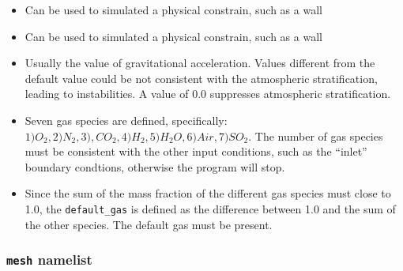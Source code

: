 \begin{itemize}
\item
{}
{Can be used to simulated a physical constrain, such as a wall}

\item
{}
{Can be used to simulated a physical constrain, such as a wall}

\item
{}
{Usually the value of gravitational acceleration. Values different
from the default value could be not consistent with the atmospheric
stratification, leading to instabilities. A value of 0.0 suppresses
atmospheric stratification}.

\item
{}
{Seven gas species are defined, specifically: \\
$ 1) O_2, 2) N_2, 3), CO_2, 4) H_2, 5) H_2O, 6) Air, 7) SO_2$. 
The number of gas species must be consistent with
the other input conditions, such as the ``inlet'' boundary condtions,
otherwise the program will stop.}

\item
{}
{Since the sum of the mass fraction of the different gas species must
close to 1.0, the {\tt default\_gas} is defined as the difference 
between 1.0 and the sum of the other species. The default gas must
be present.}

\end{itemize}

\subsubsection{{\tt mesh} namelist}

